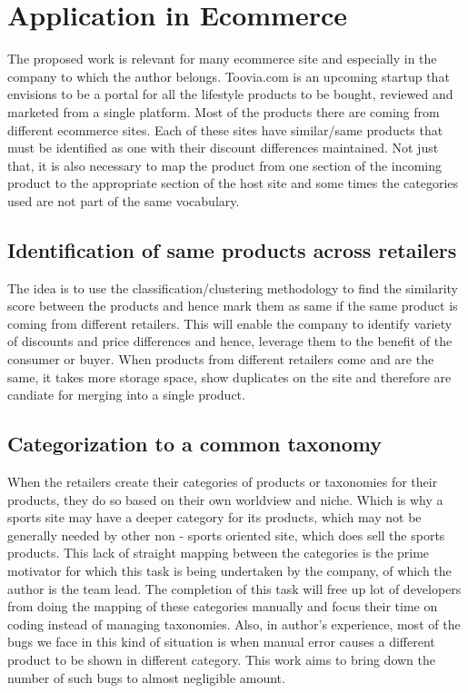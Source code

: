 \documentclass[12pt]{book}
\begin{document}
\section{Application in Ecommerce}

The proposed work is relevant for many ecommerce site and especially in the company to which the author belongs. Toovia.com is an upcoming startup that envisions to be a portal for all the lifestyle products to be 
bought, reviewed and marketed from a single platform. Most of the products there are coming from different ecommerce sites. Each of these sites have similar/same products that must be identified as one with their discount differences maintained.
Not just that, it is also necessary to map the product from one section of the incoming product to the appropriate section of the host site and some times the categories used are not part of the same vocabulary.

\subsection{Identification of same products across retailers}
The idea is to use the classification/clustering methodology to find the similarity score between the products and hence mark them as same if the same product is coming from different retailers. This will enable the company to identify variety of
discounts and price differences and hence, leverage them to the benefit of the consumer or buyer. When products from different retailers come and are the same, it takes more storage space, show duplicates on the site and therefore are candiate for 
merging into a single product.

\subsection{Categorization to a common taxonomy}
When the retailers create their categories of products or taxonomies for their products, they do so based on their own worldview and niche. Which is why a sports site may have a deeper category for its products, which may not be generally needed by
other non - sports oriented site, which does sell the sports products. This lack of straight mapping between the categories is the prime motivator for which this task is being undertaken by the company, of which the author is the team lead. The 
completion of this task will free up lot of developers from doing the mapping of these categories manually and focus their time on coding instead of managing taxonomies. Also, in author's experience, most of the bugs we face in this kind of situation 
is when manual error causes a different product to be shown in different category. This work aims to bring down the number of such bugs to almost negligible amount.
\end{document}
